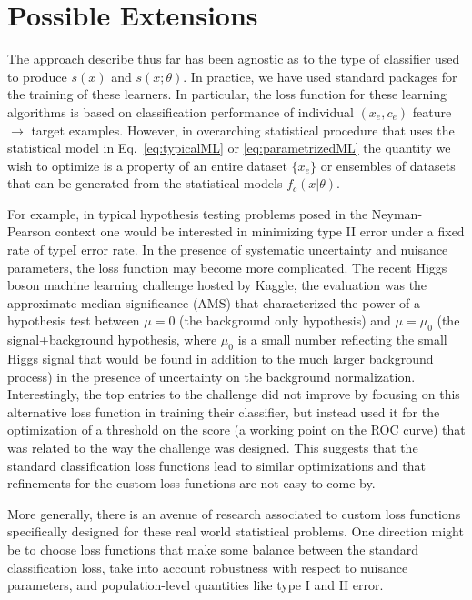 \documentclass[11pt, oneside]{article}   	%
\begin{document}
\section{Possible Extensions}
The approach describe thus far has been agnostic as to the type of classifier used to produce $s(x)$ and $s(x; \theta)$. In practice, we have used standard packages for the training of these learners. In particular, the loss function for these learning algorithms is based on classification performance of individual $(x_e, c_e)$ feature $\to$ target examples. However, in overarching statistical procedure that uses the statistical model in Eq.~\ref{eq:typicalML} or \ref{eq:parametrizedML} the quantity we wish to optimize is a property of an entire dataset $\{x_e\}$ or ensembles of datasets that can be generated from the statistical models $f_c(x|\theta)$. 

For example, in typical hypothesis testing problems posed in the Neyman-Pearson context one would be interested in minimizing type II error under a fixed rate of typeI error rate. In the presence of systematic uncertainty and nuisance parameters, the loss function may become more complicated. The recent Higgs boson machine learning challenge hosted by Kaggle, the evaluation was the approximate median significance (AMS) that characterized the power of a hypothesis test between $\mu=0$ (the background only hypothesis) and $\mu=\mu_0$ (the signal+background hypothesis, where $\mu_0$ is a small number reflecting the small Higgs signal that would be found in addition to the much larger background process) in the presence of uncertainty on the background normalization. 
Interestingly, the top entries to the challenge did not improve by focusing on this alternative loss function 
in training their classifier, but instead used it for the optimization of a threshold on the score (a working point on the ROC curve) that was related to the way the challenge was designed. This suggests that the standard 
classification loss functions lead to similar optimizations and that refinements for the custom loss functions
are not easy to come by.

More generally, there is an avenue of research associated to custom loss functions specifically designed 
for these real world statistical problems. One direction might be to choose loss functions that make 
some balance between the standard classification loss, take into account robustness with respect to nuisance parameters, and population-level quantities like type I and II error.
\end{document}
